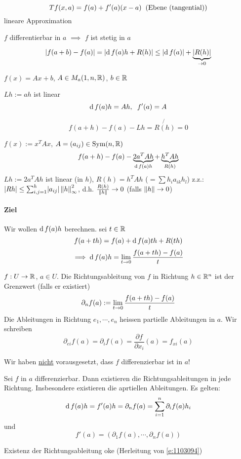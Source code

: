 \begin{Def}
  \[Tf(x,a)=f(a)+f'(a)(x-a)\hspace{2mm}\text{(Ebene (tangential))}\]
  lineare Approximation
\end{Def}
\begin{Sat}
  $f$ differentierbar in $a$ $\implies$ $f$ ist stetig in $a$
\end{Sat}
\begin{Bew}
  \[\mathopen| f(a+b)-f(a) \mathclose|=\mathopen| \operatorname{d} f(a)h+R(h) \mathclose|\leq\mathopen| \operatorname{d} f(a) \mathclose|+\underbrace{\mathopen| R(h) \mathclose|}_{\rightarrow 0}\]
\end{Bew}
\begin{Bsp}
  $f(x)=Ax+b$, $A\in M_a(1,n,\mathbb{R})$, $b\in\mathbb{R}$
  \begin{Beh}
    $Lh:=ah$ ist linear
    \[\operatorname{d} f(a)h=Ah, \hspace{2mm} f'(a)=A\]
  \end{Beh}
  \begin{Bew}
    \[f(a+h)-f(a)-Lh=\not{R(h)}=0\]
  \end{Bew}
\end{Bsp}
\begin{Bsp}
  $f(x):=x^TAx$, $A=(a_{ij})\in\operatorname{Sym}(n,\mathbb{R})$
  \[f(a+h)-f(a)-\underbrace{2a^TAh}_{\operatorname{d} f(a)h}+\underbrace{h^TAh}_{R(h)}\]
  $Lh:=2a^TAh$ ist linear (in $h$), $R(h)=h^TAh$ ($=\sum h_ia_{ik}h_l$)
  z.z.: $\mathopen| Rh \mathclose|\leq\sum^h_{i,j=1}\mathopen| a_{ij} \mathclose|\left\| h \right\|_{\infty}^2$, d.h. $\frac{R(h)}{\left\| h \right\|}\rightarrow 0$ (falls $\left\| h \right\|\rightarrow 0$)
\end{Bsp}
\paragraph{Ziel}
Wir wollen $\operatorname{d} f(a)h$ berechnen. sei $t\in\mathbb{R}$
\[f(a+th)=f(a)+\operatorname{d} f(a)th+R(th)\]
\begin{equation}
  \label{e:1103094}
  \implies \operatorname{d} f(a)h=\displaystyle\lim_{t\rightarrow0}\frac{f(a+th)-f(a)}{t}
\end{equation}
\begin{Def}
  $f:U\rightarrow\mathbb{R}$, $a\in U$. Die Richtungsableitung von $f$ in Richtung $h\in\mathbb{R}^n$ ist der Grenzwert (falls er existiert)
  \[\partial_nf(a):=\displaystyle\lim_{t\rightarrow0}\frac{f(a+th)-f(a)}{t}\]
  Die Ableitungen in Richtung $e_1,\cdots,e_n$ heissen partielle Ableitungen in $a$. Wir schreiben
  \[\partial_{ei}f(a)=\partial_if(a)=\frac{\partial f}{\partial x_i}(a)=f_{xi}(a)\]
\end{Def}
\begin{Bem}
  Wir haben \ul{nicht} vorausgesetzt, dass $f$ differenzierbar ist in $a$!
\end{Bem}
\begin{Sat}
  Sei $f$ in $a$ differenzierbar. Dann existieren die Richtungsableitungen in jede Richtung. Insbesondere existieren die aprtiellen Ableitungen. Es gelten:
  \begin{equation}
    \label{e:1103095}
    \operatorname{d} f(a)h=f'(a)h=\partial_nf(a)=\sum_{i=1}^n\partial_if(a)h_i
  \end{equation}
  und
  \[f'(a)=\left( \partial_1f(a),\cdots,\partial_nf(a) \right)\]
\end{Sat}
\begin{Bew}
  Existenz der Richtungsableitung oke (Herleitung von \ref{e:1103094})
\end{Bew}
